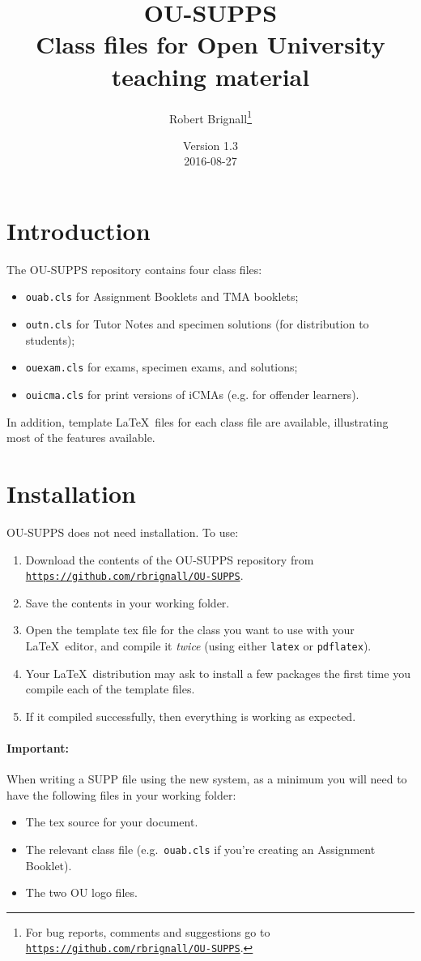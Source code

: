\documentclass[a4paper]{ltxguide}
\title{\textsf{OU-SUPPS}\\Class files for Open University teaching material}
\author{Robert Brignall\footnote{For bug reports, comments and
suggestions go to \href{https://github.com/rbrignall/OU-SUPPS}%
{\texttt{https://github.com/rbrignall/OU-SUPPS}}.}}
\date{Version 1.3\\2016-08-27}
\newcommand\3{\unskip\enspace\fbox{\fontsize{4}{4}\selectfont NEW 3.0}}
\begin{document}
\maketitle

\tableofcontents

\section{Introduction}

The \textsf{OU-SUPPS} repository contains four class files:
\begin{itemize}
\item \texttt{ouab.cls} for Assignment Booklets and TMA booklets;
\item \texttt{outn.cls} for Tutor Notes and specimen solutions (for distribution to students);
\item \texttt{ouexam.cls} for exams, specimen exams, and solutions;
\item \texttt{ouicma.cls} for print versions of iCMAs (e.g. for offender learners).
\end{itemize}

In addition, template \LaTeX\ files for each class file are available, illustrating most of the features available.

\section{Installation}

\textsf{OU-SUPPS} does not need installation. To use:

\begin{enumerate}
\item Download the contents of the \textsf{OU-SUPPS} repository from \href{https://github.com/rbrignall/OU-SUPPS}%
{\texttt{https://github.com/rbrignall/OU-SUPPS}}.
\item Save the contents in your working folder.
\item Open the template tex file for the class you want to use with your \LaTeX\ editor, and compile it \emph{twice} (using either \texttt{latex} or \texttt{pdflatex}). 
\item Your \LaTeX\ distribution may ask to install a few packages the first time you compile each of the template files.
\item If it compiled successfully, then everything is working as expected.
\end{enumerate}

\paragraph{Important:} When writing a SUPP file using the new system, as a minimum you will need to have the following files in your working folder:
\begin{itemize}
\item The tex source for your document.
\item The relevant class file (e.g.\ \texttt{ouab.cls} if you're creating an Assignment Booklet).
\item The two OU logo files.
\end{itemize}
\end{document}
